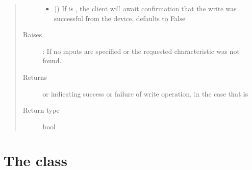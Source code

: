 \documentclass[letterpaper,10pt,english]{sphinxmanual}
\begin{document}
\begin{fulllineitems}
\begin{fulllineitems}
\begin{quote}
\begin{description}
\begin{itemize}
\item {} 
 (\sphinxstyleliteralemphasis{\sphinxupquote{, }}) \textendash{} If  is , the client will await confirmation that the write was successful from the device, defaults to False

\end{itemize}

\item[{Raises}] \leavevmode
{}: If no inputs are specified or the requested characteristic was not found.

\item[{Returns}] \leavevmode
{} or  indicating success or failure of write operation, in the case that  is 

\item[{Return type}] \leavevmode
bool

\end{description}\end{quote}

\end{fulllineitems}


\end{fulllineitems}



\section{The  class}
\label{\detokenize{simpleble:the-simplebledevice-class}}
\end{document}
